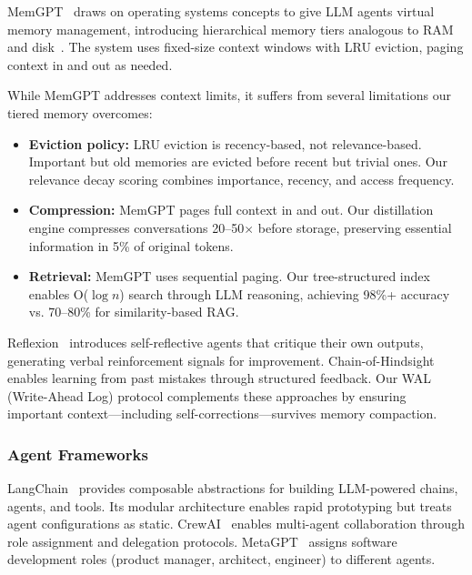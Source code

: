 \documentclass{article}
\begin{document}
MemGPT~\cite{packer2023memgpt} draws on operating systems concepts to give LLM agents virtual memory management, introducing hierarchical memory tiers analogous to RAM and disk~\cite{silberschatz2014operating}. The system uses fixed-size context windows with LRU eviction, paging context in and out as needed.

While MemGPT addresses context limits, it suffers from several limitations our tiered memory overcomes:

\begin{itemize}[leftmargin=*]
    \item \textbf{Eviction policy:} LRU eviction is recency-based, not relevance-based. Important but old memories are evicted before recent but trivial ones. Our relevance decay scoring combines importance, recency, and access frequency.
    
    \item \textbf{Compression:} MemGPT pages full context in and out. Our distillation engine compresses conversations 20--50$\times$ before storage, preserving essential information in 5\% of original tokens.
    
    \item \textbf{Retrieval:} MemGPT uses sequential paging. Our tree-structured index enables O($\log n$) search through LLM reasoning, achieving 98\%+ accuracy vs. 70--80\% for similarity-based RAG.
\end{itemize}

Reflexion~\cite{shinn2024reflexion} introduces self-reflective agents that critique their own outputs, generating verbal reinforcement signals for improvement. Chain-of-Hindsight~\cite{liu2023chain} enables learning from past mistakes through structured feedback. Our WAL (Write-Ahead Log) protocol complements these approaches by ensuring important context—including self-corrections—survives memory compaction.

\subsubsection{Agent Frameworks}

LangChain~\cite{langchain} provides composable abstractions for building LLM-powered chains, agents, and tools. Its modular architecture enables rapid prototyping but treats agent configurations as static. CrewAI~\cite{crewai} enables multi-agent collaboration through role assignment and delegation protocols. MetaGPT~\cite{ge2023metagpt} assigns software development roles (product manager, architect, engineer) to different agents.
\end{document}
